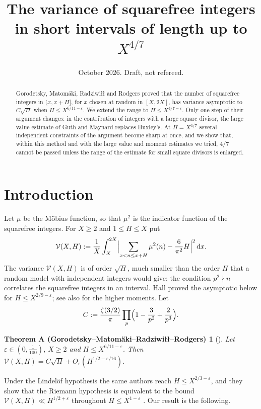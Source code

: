 \documentclass[11pt]{amsart}
\title[Squarefree variance up to $X^{4/7}$]{The variance of squarefree integers in short intervals of length up to \texorpdfstring{$X^{4/7}$}{X\textasciicircum(4/7)}}
\date{October 2026. Draft, not refereed.}
\newtheorem*{theoremGMRR}{Theorem A (Gorodetsky--Matom\"aki--Radziwi\l{}\l{}--Rodgers)}
\theoremstyle{remark}
\newcommand{\eps}{\varepsilon}
\newcommand{\dd}{\,\mathrm{d}}
\begin{document}
\begin{abstract}
Gorodetsky, Matom\"aki, Radziwi\l{}\l{} and Rodgers proved that the number of
squarefree integers in $(x,x+H]$, for $x$ chosen at random in $[X,2X]$, has
variance asymptotic to $C\sqrt H$ when $H\le X^{6/11-\eps}$.  We extend the
range to $H\le X^{4/7-\eps}$.  Only one step of their argument changes: in the
contribution of integers with a large square divisor, the large value estimate
of Guth and Maynard replaces Huxley's.  At $H=X^{4/7}$ several independent
constraints of the argument become sharp at once, and we show that, within this
method and with the large value and moment estimates we tried, $4/7$ cannot be
passed unless the range of the estimate for small square divisors is enlarged.
\end{abstract}

\maketitle

\section{Introduction}

Let $\mu$ be the M\"obius function, so that $\mu^2$ is the indicator function of
the squarefree integers.  For $X\ge 2$ and $1\le H\le X$ put
\[
  \mathcal V(X,H):=\frac1X\int_X^{2X}\Bigl|\sum_{x<n\le x+H}\mu^2(n)-\frac{6}{\pi^2}H\Bigr|^2\dd x .
\]
The variance $\mathcal V(X,H)$ is of order $\sqrt H$, much smaller than the
order $H$ that a random model with independent integers would give: the
condition $p^2\nmid n$ correlates the squarefree integers in an interval.  Hall
\cite{Ha} proved the asymptotic below for $H\le X^{2/9-\eps}$; see also
\cite{GMaR} for the higher moments.  Let
\[
  C:=\frac{\zeta(3/2)}{\pi}\prod_p\Bigl(1-\frac{3}{p^2}+\frac{2}{p^3}\Bigr).
\]

\begin{theoremGMRR}[{\cite[Theorem~1]{GMRR}}]
Let $\eps\in(0,\frac1{100})$, $X\ge 2$ and $H\le X^{6/11-\eps}$.  Then
$\mathcal V(X,H)=C\sqrt H+O_\eps(H^{1/2-\eps/16})$.
\end{theoremGMRR}

Under the Lindel\"of hypothesis the same authors reach $H\le X^{2/3-\eps}$, and
they show that the Riemann hypothesis is equivalent to the bound
$\mathcal V(X,H)\ll H^{1/2+\eps}$ throughout $H\le X^{1-\eps}$
\cite[Theorems~1 and~3]{GMRR}.  Our result is the following.
\end{document}
